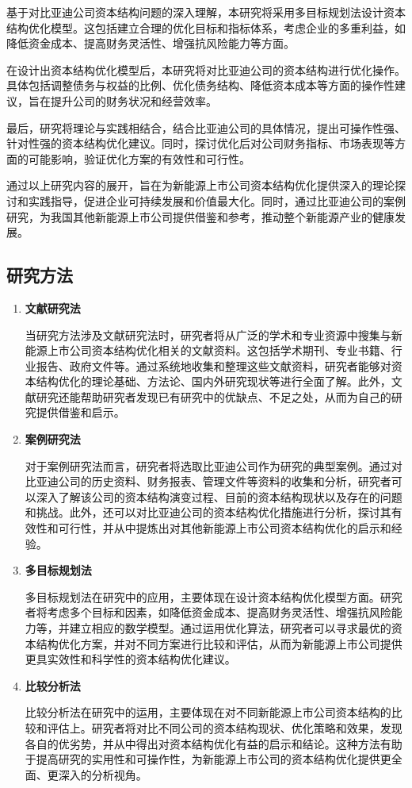 基于对比亚迪公司资本结构问题的深入理解，本研究将采用多目标规划法设计资本结构优化模型。这包括建立合理的优化目标和指标体系，考虑企业的多重利益，如降低资金成本、提高财务灵活性、增强抗风险能力等方面。

在设计出资本结构优化模型后，本研究将对比亚迪公司的资本结构进行优化操作。具体包括调整债务与权益的比例、优化债务结构、降低资本成本等方面的操作性建议，旨在提升公司的财务状况和经营效率。

最后，研究将理论与实践相结合，结合比亚迪公司的具体情况，提出可操作性强、针对性强的资本结构优化建议。同时，探讨优化后对公司财务指标、市场表现等方面的可能影响，验证优化方案的有效性和可行性。

通过以上研究内容的展开，旨在为新能源上市公司资本结构优化提供深入的理论探讨和实践指导，促进企业可持续发展和价值最大化。同时，通过比亚迪公司的案例研究，为我国其他新能源上市公司提供借鉴和参考，推动整个新能源产业的健康发展。
\subsection{研究方法}
\begin{enumerate}[label=(\arabic*)]
\item \textbf{文献研究法}

当研究方法涉及文献研究法时，研究者将从广泛的学术和专业资源中搜集与新能源上市公司资本结构优化相关的文献资料。这包括学术期刊、专业书籍、行业报告、政府文件等。通过系统地收集和整理这些文献资料，研究者能够对资本结构优化的理论基础、方法论、国内外研究现状等进行全面了解。此外，文献研究还能帮助研究者发现已有研究中的优缺点、不足之处，从而为自己的研究提供借鉴和启示。
\item \textbf{案例研究法}

对于案例研究法而言，研究者将选取比亚迪公司作为研究的典型案例。通过对比亚迪公司的历史资料、财务报表、管理文件等资料的收集和分析，研究者可以深入了解该公司的资本结构演变过程、目前的资本结构现状以及存在的问题和挑战。此外，还可以对比亚迪公司的资本结构优化措施进行分析，探讨其有效性和可行性，并从中提炼出对其他新能源上市公司资本结构优化的启示和经验。
\item \textbf{多目标规划法}

多目标规划法在研究中的应用，主要体现在设计资本结构优化模型方面。研究者将考虑多个目标和因素，如降低资金成本、提高财务灵活性、增强抗风险能力等，并建立相应的数学模型。通过运用优化算法，研究者可以寻求最优的资本结构优化方案，并对不同方案进行比较和评估，从而为新能源上市公司提供更具实效性和科学性的资本结构优化建议。
\item \textbf{比较分析法}

比较分析法在研究中的运用，主要体现在对不同新能源上市公司资本结构的比较和评估上。研究者将对比不同公司的资本结构现状、优化策略和效果，发现各自的优劣势，并从中得出对资本结构优化有益的启示和结论。这种方法有助于提高研究的实用性和可操作性，为新能源上市公司的资本结构优化提供更全面、更深入的分析视角。
\end{enumerate}
\cite{Brusov2023}
\cite{Cao2018}
\cite{Chen2022}
\cite{Dai2022}
\cite{Dong2019}
\cite{Du2016}
\cite{Gu2022}
\cite{Hong2015}
\cite{Li2019}
\cite{Li2019a}
\cite{Li2021}
\cite{Li2023}
\cite{Liaqat2021}
\cite{Liu2017}
\cite{Liu2019}
\cite{Liu2022}
\cite{Liu2023}


